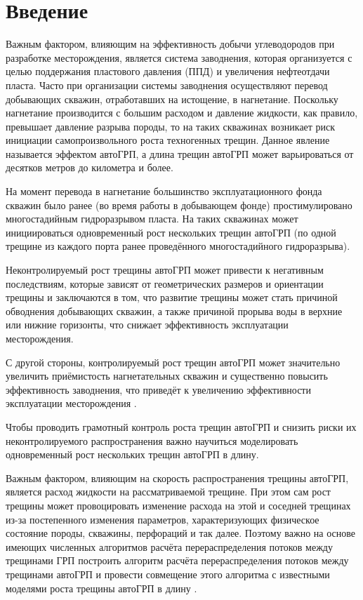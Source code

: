 \chapter*{Введение} %


Важным фактором, влияющим на эффективность добычи углеводородов при разработке месторождения, является система заводнения, которая организуется с целью поддержания пластового давления (ППД) и увеличения нефтеотдачи пласта.
Часто при организации системы заводнения осуществляют перевод добывающих скважин, отработавших на истощение, в нагнетание.
Поскольку нагнетание производится с большим расходом и давление жидкости, как правило, превышает давление разрыва породы, то на таких скважинах возникает риск инициации самопроизвольного роста техногенных трещин.
Данное явление называется эффектом автоГРП, а длина трещин автоГРП может варьироваться от десятков метров до километра и более.

На момент перевода в нагнетание большинство эксплуатационного фонда скважин было ранее (во время работы в добывающем фонде) простимулировано многостадийным гидроразрывом пласта.
На таких скважинах может инициироваться одновременный рост нескольких трещин автоГРП (по одной трещине из каждого порта ранее проведённого многостадийного гидроразрыва).

Неконтролируемый рост трещины автоГРП может привести к негативным последствиям, которые зависят от геометрических размеров и ориентации трещины и заключаются в том, что развитие трещины может стать причиной обводнения добывающих скважин, а также причиной прорыва воды в верхние или нижние горизонты, что снижает эффективность эксплуатации месторождения.

С другой стороны, контролируемый рост трещин автоГРП может значительно увеличить приёмистость нагнетательных скважин и существенно повысить эффективность заводнения, что приведёт к увеличению эффективности эксплуатации месторождения \cite{bazyrov_shel, yakupov}.

Чтобы проводить грамотный контроль роста трещин автоГРП и снизить риски их неконтролируемого распространения важно научиться моделировать одновременный рост нескольких трещин автоГРП в длину.

Важным фактором, влияющим на скорость распространения трещины автоГРП, является расход жидкости на рассматриваемой трещине.
При этом сам рост трещины может провоцировать изменение расхода на этой и соседней трещинах из-за постепенного изменения параметров, характеризующих физическое состояние породы, скважины, перфораций и так далее.
Поэтому важно на основе имеющих численных алгоритмов расчёта перераспределения потоков между трещинами ГРП \cite{elbel} построить алгоритм расчёта перераспределения потоков между трещинами автоГРП и провести совмещение этого алгоритма с известными моделями роста трещины автоГРП в длину \cite{koning}.

